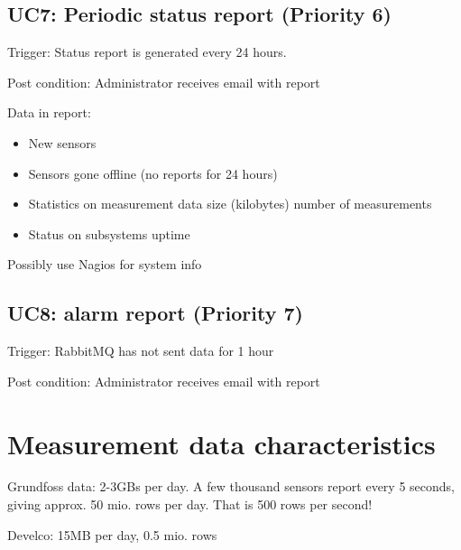 \subsection*{UC7: Periodic status report (Priority 6)}
\noindent Trigger: Status report is generated every 24 hours.

\noindent Post condition: Administrator receives email with report

\noindent Data in report: 
\begin{itemize}
    \item New sensors
    \item Sensors gone offline (no reports for 24 hours)
    \item Statistics on measurement data
        \subitem size (kilobytes)
        \subitem number of measurements
    \item Status on subsystems 
        \subitem uptime
\end{itemize}
Possibly use Nagios for system info


\subsection*{UC8: alarm report (Priority 7)}
\noindent Trigger: RabbitMQ has not sent data for 1 hour

\noindent Post condition: Administrator receives email with report

\section{Measurement data characteristics}
Grundfoss data: 2-3GBs per day. A few thousand sensors report every 5 seconds, giving approx. 50 mio. rows per day. That is 500 rows per second!

Develco: 15MB per day, 0.5 mio. rows
